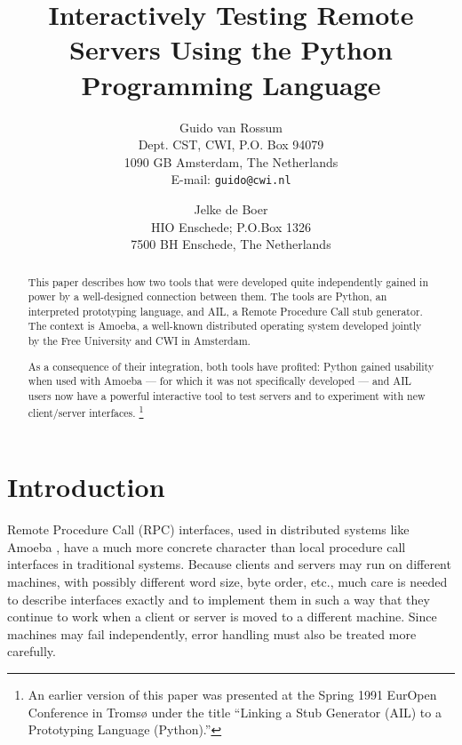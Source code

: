 
\title{
Interactively Testing Remote Servers Using the Python Programming Language
}

\author{
	Guido van Rossum \\
	Dept. CST, CWI, P.O. Box 94079 \\
	1090 GB Amsterdam, The Netherlands \\
	E-mail: {\tt guido@cwi.nl}
\and
	Jelke de Boer \\
	HIO Enschede; P.O.Box 1326 \\
	7500 BH  Enschede, The Netherlands
}



\maketitle

\begin{abstract}
This paper describes how two tools that were developed quite
independently gained in power by a well-designed connection between
them.  The tools are Python, an interpreted prototyping language, and
AIL, a Remote Procedure Call stub generator.  The context is Amoeba, a
well-known distributed operating system developed jointly by the Free
University and CWI in Amsterdam.

As a consequence of their integration, both tools have profited:
Python gained usability when used with Amoeba --- for which it was not
specifically developed --- and AIL users now have a powerful
interactive tool to test servers and to experiment with new
client/server interfaces.%
\footnote{
An earlier version of this paper was presented at the Spring 1991
EurOpen Conference in Troms{\o} under the title ``Linking a Stub
Generator (AIL) to a Prototyping Language (Python).''
}
\end{abstract}

\section{Introduction}

Remote Procedure Call (RPC) interfaces, used in distributed systems
like Amoeba
\cite{Amoeba:IEEE,Amoeba:CACM},
have a much more concrete character than local procedure call
interfaces in traditional systems.  Because clients and servers may
run on different machines, with possibly different word size, byte
order, etc., much care is needed to describe interfaces exactly and to
implement them in such a way that they continue to work when a client
or server is moved to a different machine.  Since machines may fail
independently, error handling must also be treated more carefully.

